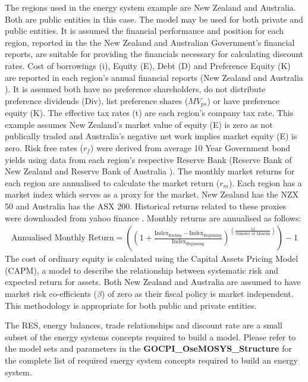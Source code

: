 \documentclass[12pt]{article}
\begin{document}
The regions used in the energy system example are New Zealand and Australia. 
Both are public entities in this case.
The model may be used for both private and public entities.
It is assumed the financial performance and position for each region, reported in the the New Zealand and Australian Government's financial reports, are suitable for providing the financials necessary for calculating discount rates.
Cost of borrowings (i), Equity (E),  Debt (D) and Preference Equity (K) 
are reported in each region's annual financial reports (New Zealand \cite{TNZ_FR} and Australia \cite{AG_FR}).
It is assumed both have no preference shareholders, do not distribute preference dividends (Div), list preference shares ($MV_{ps}$) or have preference equity (K).
The effective tax rates (t) are each region's company tax rate. 
This example assumes New Zealand's market value of equity (E) is zero as not publically traded and Australia's negative net work implies market equity (E) is zero.
Risk free rates ($r_f$) were derived from average 10 Year Government bond yields using data from each region's respective 
Reserve Bank (Reserve Bank of New Zealand \cite{RBNZ_WIR} and Reserve Bank of Australia \cite{RBA_ZCL}). 
The monthly market returns for each region are annualised to calculate the market return ($r_m$). 
Each region has a market index which serves as a proxy for the market. 
New Zealand has the NZX 50 and Australia has the ASX 200. Historical returns related to these proxies were downloaded from yahoo finance \cite{ASX_NZ}.
Monthly returns are annualised as follows: 
\begin{align}
	\text{Annualised Monthly Return} = ((1 + \frac{\text{Index}_{\text{Ending}}-\text{Index}_{\text{Beginning}}}{\text{Index}_{\text{Beginning}}})^{(\frac{12}{\text{Number of Months}})})-1
\end{align}
The cost of ordinary equity is calculated using the Capital Assets Pricing Model (CAPM), a model to describe the relationship between systematic risk and expected return for assets.
Both New Zealand and Australia are assumed to have market risk co-efficients ($\beta$) of zero as their fiscal policy is market independent.
This methodology is appropriate for both public and private entities.

The RES, energy balances, trade relationships and discount rate are a small subset of the energy systems concepts required to build a model.
Please refer to the model sets and parameters in the \textbf{GOCPI\_OseMOSYS\_Structure} for the complete list of required energy system concepts required to build an energy system.
\end{document}
